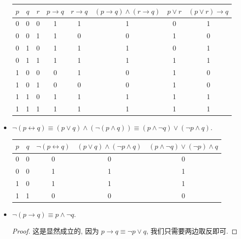 \documentclass[10pt,UTF8]{book} %
\begin{document}
\begin{exercise}
\begin{itemize}[itemsep=0pt]
\begin{table}[H]
\begin{tabular}{cccccccc}
                \hline
                $p$ & $q$ & $r$ & $p \to q$ & $r \to q$ & $(p \to q) \wedge (r \to q)$ & $p \vee r$ & $(p \vee r) \to q$ \\ 
                \hline
                0 & 0 & 0 & 1 & 1 & 1 & 0 & 1 \\ 
                0 & 0 & 1 & 1 & 0 & 0 & 1 & 0 \\ 
                0 & 1 & 0 & 1 & 1 & 1 & 0 & 1 \\
                0 & 1 & 1 & 1 & 1 & 1 & 1 & 1 \\
                1 & 0 & 0 & 0 & 1 & 0 & 1 & 0 \\
                1 & 0 & 1 & 0 & 0 & 0 & 1 & 0 \\
                1 & 1 & 0 & 1 & 1 & 1 & 1 & 1 \\
                1 & 1 & 1 & 1 & 1 & 1 & 1 & 1 \\
                \hline 
            \end{tabular}
        \end{table}
        \item $\lnot(p \leftrightarrow q) \equiv (p \vee q) \wedge (\lnot(p \wedge q)) \equiv (p \wedge \lnot q)\vee(\lnot p \wedge q)$.
        \begin{table}[H]
            \centering
            \begin{tabular}{ccccc}
                \hline
                $p$ & $q$ & $\lnot(p \leftrightarrow q)$ & $(p \vee q) \wedge (\lnot p \wedge q)$ & $(p \wedge \lnot q) \vee (\lnot p) \wedge q$ \\
                \hline 
                0 & 0 & 0 & 0 & 0 \\
                0 & 0 & 1 & 1 & 1 \\
                1 & 0 & 1 & 1 & 1 \\
                1 & 1 & 0 & 0 & 0 \\
                \hline
            \end{tabular}
        \end{table}
        \item $\lnot (p \to q) \equiv p \wedge \lnot q$.
        \begin{proof}
            这是显然成立的, 因为 $p \to q \equiv \lnot p \vee q$, 我们只需要两边取反即可.
        \end{proof}
    \end{itemize}
\end{exercise}
\end{document}
